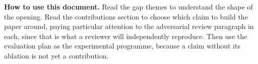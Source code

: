 \vspace{0.4em}
\begin{takeaway}
\textbf{How to use this document.} Read the gap themes to understand the shape
of the opening. Read the contributions section to choose which claim to build
the paper around, paying particular attention to the adversarial review
paragraph in each, since that is what a reviewer will independently reproduce.
Then use the evaluation plan as the experimental programme, because a claim
without its ablation is not yet a contribution.
\end{takeaway}

\newpage
